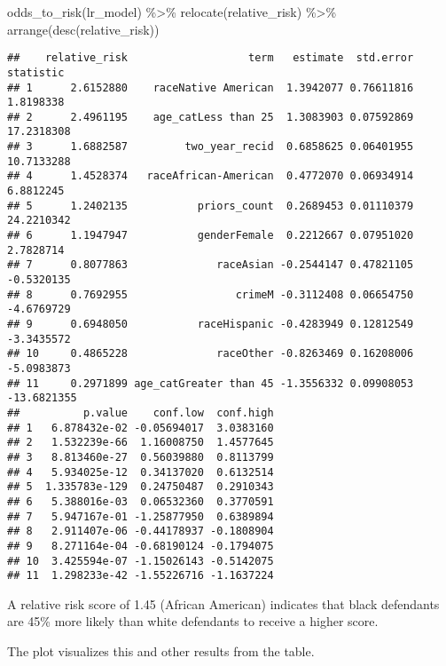\documentclass[
]{book}
\newenvironment{Shaded}{\begin{snugshade}}{\end{snugshade}}
\newcommand{\FunctionTok}[1]{\textcolor[rgb]{0.00,0.00,0.00}{#1}}
\newcommand{\NormalTok}[1]{#1}
\newcommand{\SpecialCharTok}[1]{\textcolor[rgb]{0.00,0.00,0.00}{#1}}
\begin{document}
\begin{Shaded}
\begin{Highlighting}[]
\FunctionTok{odds\_to\_risk}\NormalTok{(lr\_model) }\SpecialCharTok{\%\textgreater{}\%}
  \FunctionTok{relocate}\NormalTok{(relative\_risk) }\SpecialCharTok{\%\textgreater{}\%}
  \FunctionTok{arrange}\NormalTok{(}\FunctionTok{desc}\NormalTok{(relative\_risk))}
\end{Highlighting}
\end{Shaded}

\begin{verbatim}
##    relative_risk                   term   estimate  std.error   statistic
## 1      2.6152880    raceNative American  1.3942077 0.76611816   1.8198338
## 2      2.4961195    age_catLess than 25  1.3083903 0.07592869  17.2318308
## 3      1.6882587         two_year_recid  0.6858625 0.06401955  10.7133288
## 4      1.4528374   raceAfrican-American  0.4772070 0.06934914   6.8812245
## 5      1.2402135           priors_count  0.2689453 0.01110379  24.2210342
## 6      1.1947947           genderFemale  0.2212667 0.07951020   2.7828714
## 7      0.8077863              raceAsian -0.2544147 0.47821105  -0.5320135
## 8      0.7692955                 crimeM -0.3112408 0.06654750  -4.6769729
## 9      0.6948050           raceHispanic -0.4283949 0.12812549  -3.3435572
## 10     0.4865228              raceOther -0.8263469 0.16208006  -5.0983873
## 11     0.2971899 age_catGreater than 45 -1.3556332 0.09908053 -13.6821355
##          p.value    conf.low  conf.high
## 1   6.878432e-02 -0.05694017  3.0383160
## 2   1.532239e-66  1.16008750  1.4577645
## 3   8.813460e-27  0.56039880  0.8113799
## 4   5.934025e-12  0.34137020  0.6132514
## 5  1.335783e-129  0.24750487  0.2910343
## 6   5.388016e-03  0.06532360  0.3770591
## 7   5.947167e-01 -1.25877950  0.6389894
## 8   2.911407e-06 -0.44178937 -0.1808904
## 9   8.271164e-04 -0.68190124 -0.1794075
## 10  3.425594e-07 -1.15026143 -0.5142075
## 11  1.298233e-42 -1.55226716 -1.1637224
\end{verbatim}

A relative risk score of 1.45 (African American) indicates that black defendants are 45\% more likely than white defendants to receive a higher score.

The plot visualizes this and other results from the table.
\end{document}
